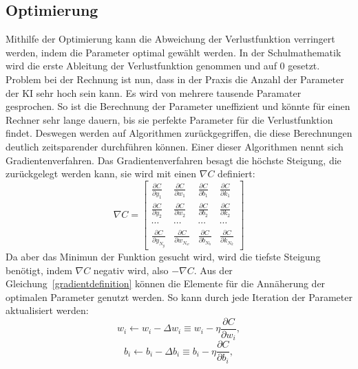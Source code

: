 \documentclass[11pt]{article}
\begin{document}
\subsection{Optimierung}\label{gradient}
Mithilfe der Optimierung kann die Abweichung der Verlustfunktion verringert werden, indem die Parameter optimal gewählt werden. In der Schulmathematik
wird die erste Ableitung der Verlustfunktion genommen und auf $0$ gesetzt. Problem bei der Rechnung ist nun, dass in der Praxis die Anzahl der Parameter
der KI sehr hoch sein kann. Es wird von mehrere tausende Paramater gesprochen. So ist die Berechnung der Parameter uneffizient und könnte für einen
Rechner sehr lange dauern, bis sie perfekte Parameter für die Verlustfunktion findet. Deswegen werden auf Algorithmen zurückgegriffen, die diese
Berechnungen deutlich zeitsparender durchführen können. Einer dieser Algorithmen nennt sich Gradientenverfahren. Das Gradientenverfahren besagt die höchste
Steigung, die zurückgelegt werden kann, sie wird mit einen $\nabla C$ definiert:
\begin{equation}\label{gradientdefinition}
    \nabla C =
    \begin{bmatrix}
        \frac{\partial C}{\partial y_{1}} & \frac{\partial C}{\partial w_{1}} & \frac{\partial C}{\partial b_{1}} & \frac{\partial C}{\partial k_{1}}
        \\ \frac{\partial C}{\partial y_{2}} & \frac{\partial C}{\partial w_{2}} & \frac{\partial C}{\partial b_{2}} & \frac{\partial C}{\partial k_{2}}
        \\ \cdots & \cdots & \cdots & \cdots
        \\ \frac{\partial C}{\partial y_{N_y}} & \frac{\partial C}{\partial w_{N_w}} & \frac{\partial C}{\partial b_{N_b}} & \frac{\partial C}{\partial k_{N_k}}
    \end{bmatrix}
\end{equation}
Da aber das Minimun der Funktion gesucht wird, wird die tiefste Steigung
benötigt, indem $\nabla C$ negativ wird, also $-\nabla C$. Aus der Gleichung~\ref{gradientdefinition} können die Elemente für die Annäherung der optimalen Parameter genutzt werden.
So kann durch jede Iteration der Parameter aktualisiert werden:
\begin{equation}
    w_i \leftarrow w_i - \Delta w_i \equiv  w_i - \eta \frac{\partial C}{\partial w_{i}},
\end{equation}
\begin{equation}
    b_i \leftarrow b_i - \Delta b_i \equiv  b_i - \eta \frac{\partial C}{\partial b_{i}},
\end{equation}
\end{document}
